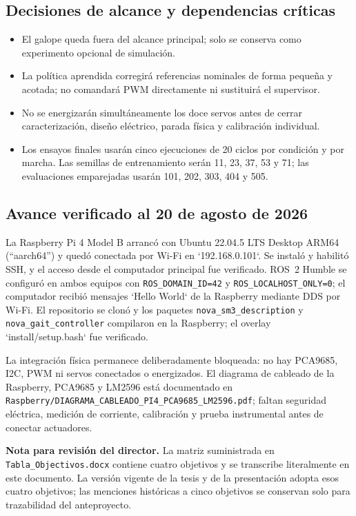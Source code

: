\documentclass[10pt,letterpaper]{article}
\begin{document}
\subsection*{Decisiones de alcance y dependencias críticas}

\begin{itemize}
\item El galope queda fuera del alcance principal; solo se conserva como experimento opcional de simulación.
\item La política aprendida corregirá referencias nominales de forma pequeña y acotada; no comandará PWM directamente ni sustituirá el supervisor.
\item No se energizarán simultáneamente los doce servos antes de cerrar caracterización, diseño eléctrico, parada física y calibración individual.
\item Los ensayos finales usarán cinco ejecuciones de 20 ciclos por condición y por marcha. Las semillas de entrenamiento serán 11, 23, 37, 53 y 71; las evaluaciones emparejadas usarán 101, 202, 303, 404 y 505.
\end{itemize}

\subsection*{Avance verificado al 20 de agosto de 2026}

La Raspberry Pi 4 Model B arrancó con Ubuntu 22.04.5 LTS Desktop ARM64
(``aarch64'') y quedó conectada por Wi-Fi en `192.168.0.101`. Se instaló y
habilitó SSH, y el acceso desde el computador principal fue verificado. ROS~2
Humble se configuró en ambos equipos con \texttt{ROS\_DOMAIN\_ID=42} y
\texttt{ROS\_LOCALHOST\_ONLY=0}; el computador recibió mensajes `Hello World` de la
Raspberry mediante DDS por Wi-Fi. El repositorio se clonó y los paquetes
\texttt{nova\_sm3\_description} y \texttt{nova\_gait\_controller} compilaron en la Raspberry;
el overlay `install/setup.bash` fue verificado.

La integración física permanece deliberadamente bloqueada: no hay PCA9685,
I2C, PWM ni servos conectados o energizados. El diagrama de cableado de la
Raspberry, PCA9685 y LM2596 está documentado en
\texttt{Raspberry/DIAGRAMA\_CABLEADO\_PI4\_PCA9685\_LM2596.pdf}; faltan seguridad
eléctrica, medición de corriente, calibración y prueba instrumental antes de
conectar actuadores.

\textbf{Nota para revisión del director.} La matriz suministrada en \texttt{Tabla\_Objectivos.docx} contiene cuatro objetivos y se transcribe literalmente en este documento. La versión vigente de la tesis y de la presentación adopta esos cuatro objetivos; las menciones históricas a cinco objetivos se conservan solo para trazabilidad del anteproyecto.
\end{document}
